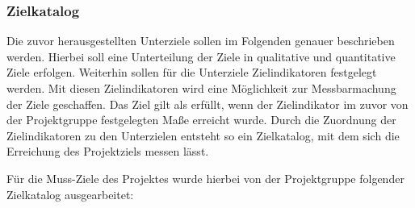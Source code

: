 \subsubsection{Zielkatalog}
\label{sec:Zielkatalog}

Die zuvor herausgestellten Unterziele sollen im Folgenden genauer beschrieben
werden. Hierbei soll eine Unterteilung der Ziele in qualitative und quantitative
Ziele erfolgen. Weiterhin sollen für die Unterziele Zielindikatoren festgelegt
werden. Mit diesen Zielindikatoren wird eine Möglichkeit zur Messbarmachung der
Ziele geschaffen. Das Ziel gilt als erfüllt, wenn der Zielindikator im zuvor von
der Projektgruppe festgelegten Maße erreicht wurde. Durch die Zuordnung der
Zielindikatoren zu den Unterzielen entsteht so ein Zielkatalog, mit dem sich
die Erreichung des Projektziels messen lässt.

Für die Muss-Ziele des Projektes wurde hierbei von der Projektgruppe folgender
Zielkatalog ausgearbeitet:

